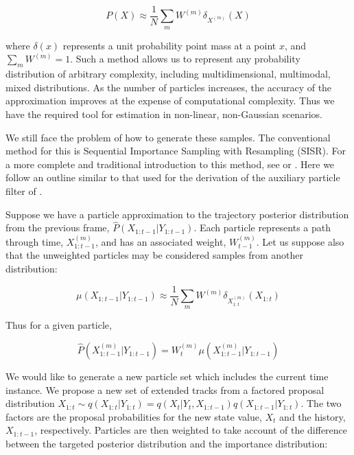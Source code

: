 \begin{equation}
P(X) \approx \frac{1}{N} \sum_m{W^{(m)} \delta_{X^{(m)}} (X)}
\label{eq:ParticleApprox}
\end{equation}

where $\delta (x)$ represents a unit probability point mass at a point $x$, and $\sum_m{W^{(m)}}=1$. Such a method allows us to represent any probability distribution of arbitrary complexity, including multidimensional, multimodal, mixed distributions. As the number of particles increases, the accuracy of the approximation improves at the expense of computational complexity. Thus we have the required tool for estimation in non-linear, non-Gaussian scenarios.

We still face the problem of how to generate these samples. The conventional method for this is Sequential Importance Sampling with Resampling (SISR). For a more complete and traditional introduction to this method, see \cite{Cappe2007} or \cite{Doucet2009}. Here we follow an outline similar to that used for the derivation of the auxiliary particle filter of \cite{Pitt1999}.

Suppose we have a particle approximation to the trajectory posterior distribution from the previous frame, $\hat{P}(X_{1:t-1}|Y_{1:t-1})$. Each particle represents a path through time, $X_{1:t-1}^{(m)}$, and has an associated weight, $W_{t-1}^{(m)}$. Let us suppose also that the unweighted particles may be considered samples from another distribution:

\begin{equation}
\mu(X_{1:t-1}|Y_{1:t-1}) \approx \frac{1}{N} \sum_m{W^{(m)} \delta_{X_{1:t}^{(m)}} (X_{1:t})}
\label{eq:UnweightParticleDistn}
\end{equation}

Thus for a given particle,

\begin{equation}
\hat{P}(X_{1:t-1}^{(m)}|Y_{1:t-1}) = W_t^{(m)} \mu(X_{1:t-1}^{(m)}|Y_{1:t-1})
\label{eq:}
\end{equation}

We would like to generate a new particle set which includes the current time instance. We propose a new set of extended tracks from a factored proposal distribution $X_{1:t} \sim q(X_{1:t}|Y_{1:t}) = q(X_{t}|Y_{t}, X_{1:t-1}) q(X_{1:t-1}|Y_{1:t})$. The two factors are the proposal probabilities for the new state value, $X_t$ and the history, $X_{1:t-1}$, respectively. Particles are then weighted to take account of the difference between the targeted posterior distribution and the importance distribution:

